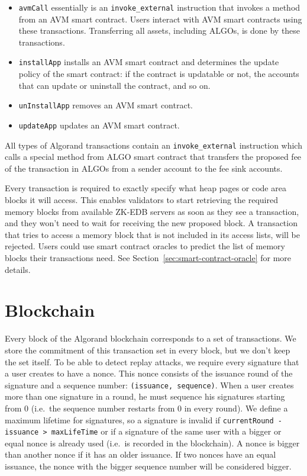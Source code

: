 \documentclass[11pt, A4]{report}
\begin{document}
    \begin{itemize}
        \item \texttt{avmCall} essentially is an \texttt{invoke\_external} instruction that invokes a method from an
        AVM smart contract. Users interact with AVM smart contracts using these transactions. Transferring all
        assets, including ALGOs, is done by these transactions.
        \item \texttt{installApp} installs an AVM smart contract and determines the update policy of the smart
        contract: if the contract is updatable or not, the accounts that can update or uninstall the contract, and so
        on.
        \item \texttt{unInstallApp} removes an AVM smart contract.
        \item \texttt{updateApp} updates an AVM smart contract.
    \end{itemize}

    All types of Algorand transactions contain an \texttt{invoke\_external} instruction which calls a special method
    from ALGO smart contract that transfers the proposed fee of the transaction in ALGOs from a sender account to the
    fee sink accounts.

    Every transaction is required to exactly specify what heap pages or code area blocks it will access. This enables
    validators to start retrieving the required memory blocks from available ZK-EDB servers as soon as they see a
    transaction, and they won't need to wait for receiving the new proposed block. A transaction that tries to access
    a memory block that is not included in its access lists, will be rejected. Users could
    use smart contract oracles to predict the list of memory blocks their transactions need. See
    Section~\ref{sec:smart-contract-oracle} for more details.


    \section{Blockchain}\label{sec:blockchain}

    Every block of the Algorand blockchain corresponds to a set of transactions. We store the commitment of this
    transaction set in every block, but we don't keep the set itself. To be able to detect replay attacks, we require
    every signature that a user creates to have a nonce. This nonce consists of the issuance round of the signature
    and a sequence number: \texttt{(issuance,\ sequence)}. When a user creates more than one signature in a round, he
    must sequence his signatures starting from 0 (i.e.~the sequence number restarts from 0 in every round). We define
    a maximum lifetime for signatures, so a signature is invalid if \texttt{currentRound - issuance \textgreater{}\
        maxLifeTime} or if a signature of the same user with a bigger or equal nonce is already used
    (i.e.~is recorded in the blockchain). A nonce is bigger than another nonce if it has an older issuance. If two
    nonces have an equal issuance, the nonce with the bigger sequence number will be considered bigger.
\end{document}
